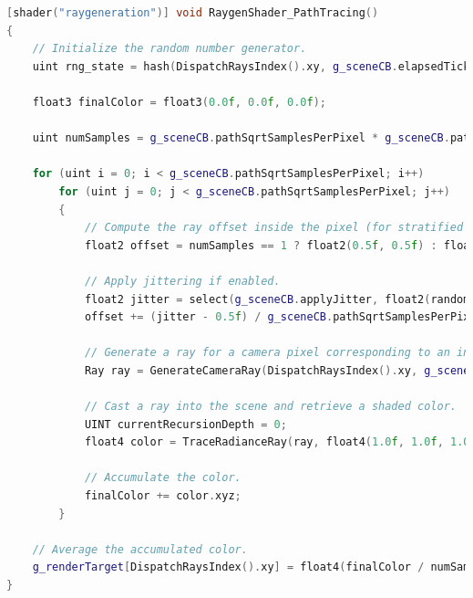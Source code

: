 \documentclass[12pt,a4paper]{report}
\numberwithin{equation}{section} %
\begin{document}
\begin{lstlisting}[caption={Generarea razelor în algoritmul Path Tracing},label={lst:raygen},language=C++]
[shader("raygeneration")] void RaygenShader_PathTracing()
{
	// Initialize the random number generator.
	uint rng_state = hash(DispatchRaysIndex().xy, g_sceneCB.elapsedTicks);

	float3 finalColor = float3(0.0f, 0.0f, 0.0f);

	uint numSamples = g_sceneCB.pathSqrtSamplesPerPixel * g_sceneCB.pathSqrtSamplesPerPixel;

	for (uint i = 0; i < g_sceneCB.pathSqrtSamplesPerPixel; i++)
		for (uint j = 0; j < g_sceneCB.pathSqrtSamplesPerPixel; j++)
		{
			// Compute the ray offset inside the pixel (for stratified sampling), between 0 and 1.
			float2 offset = numSamples == 1 ? float2(0.5f, 0.5f) : float2((i + 0.5f) / g_sceneCB.pathSqrtSamplesPerPixel, (j + 0.5f) / g_sceneCB.pathSqrtSamplesPerPixel);

			// Apply jittering if enabled.
			float2 jitter = select(g_sceneCB.applyJitter, float2(random(rng_state), random(rng_state)), float2(0.5f, 0.5f)); // in [0, 1)
			offset += (jitter - 0.5f) / g_sceneCB.pathSqrtSamplesPerPixel;

			// Generate a ray for a camera pixel corresponding to an index from the dispatched 2D grid.
			Ray ray = GenerateCameraRay(DispatchRaysIndex().xy, g_sceneCB.cameraPosition.xyz, g_sceneCB.projectionToWorld, offset);

			// Cast a ray into the scene and retrieve a shaded color.
			UINT currentRecursionDepth = 0;
			float4 color = TraceRadianceRay(ray, float4(1.0f, 1.0f, 1.0f, 1.0f), float4(0.0f, 0.0f, 0.0f, 0.0f), currentRecursionDepth);

			// Accumulate the color.
			finalColor += color.xyz;
		}

	// Average the accumulated color.
	g_renderTarget[DispatchRaysIndex().xy] = float4(finalColor / numSamples, 1.0f);
}
\end{lstlisting}
\end{document}
